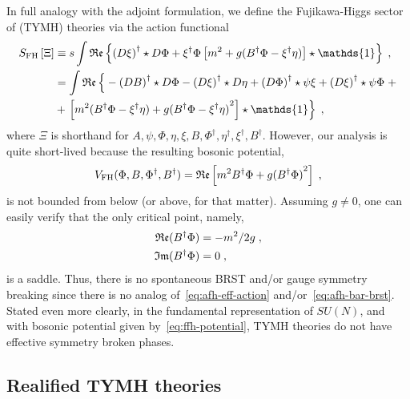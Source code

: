 \documentclass[../main.tex]{subfiles}
\begin{document}
In full analogy with the adjoint formulation, we define the Fujikawa-Higgs sector of  (TYMH) theories via the action functional
\begin{subequations}%
  \label{eq:ffh-action}
  \begin{align}%
    S_{\text{FH}} \left[ \Xi \right] & \equiv s \int \mathfrak{Re}\left\{{(D \xi)}^{\dagger} \star D \Phi + {\xi}^{\dagger} \Phi \left[m^2 + g ( {B}^{\dagger} \Phi - {\xi}^{\dagger} \eta ) \right] \star \mathds{1} \right\} \;,         \\
                                     & = \int \re \left\{ \vphantom{m^2} -{(DB)}^{\dagger} \star D \Phi - {(D \xi)}^{\dagger} \star D \eta + {(D \Phi)}^{\dagger} \star \psi \xi + {(D \xi)}^{\dagger} \star \psi \Phi \right. + \nonumber \\
                                     & + \left. \left[ m^2 ( {B}^{\dagger} \Phi - {\xi}^{\dagger} \eta ) + g {( {B}^{\dagger} \Phi - {\xi}^{\dagger} \eta )}^{2} \right] \star \mathds{1}  \right\} \;,
  \end{align}
\end{subequations}
where $\Xi$ is shorthand for $A, \psi, \Phi, \eta, \xi, B, {\Phi}^{\dagger}, {\eta}^{\dagger}, {\xi}^{\dagger}, {B}^{\dagger}$. However, our analysis is quite short-lived because the resulting bosonic potential,
\begin{equation}%
  \label{eq:ffh-potential}
  V_{\text{FH}} ( \Phi, B, {\Phi}^{\dagger}, {B}^{\dagger} ) = \re \left[m^2 B^{\dagger} \Phi + g {( B^{\dagger} \Phi )}^2\right] \;,
\end{equation}
is not bounded from below (or above, for that matter). Assuming $g \neq 0$, one can easily verify that the only critical point, namely,
\begin{subequations}%
  \label{eq:saddle-pts}
  \begin{align}
    \operatorname{\mathfrak{Re}} ({B}^{\dagger}\Phi) & = -m^2/2g \;, \\
    \operatorname{\mathfrak{Im}} ({B}^{\dagger}\Phi) & = 0 \;,
  \end{align}
\end{subequations}
is a saddle. Thus, there is no spontaneous BRST and/or gauge symmetry breaking since there is no analog of~\eqref{eq:afh-eff-action} and/or~\eqref{eq:afh-bar-brst}. Stated even more clearly, in the fundamental representation of $SU(N)$, and with bosonic potential given by~\eqref{eq:ffh-potential}, TYMH theories do not have effective symmetry broken phases.

\subsection{Realified TYMH theories}%
\end{document}
